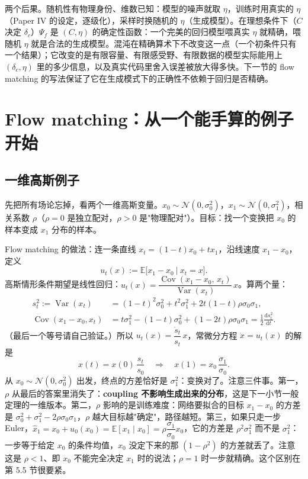 \documentclass[11pt,UTF8,fontset=none]{ctexart}
\newcommand{\E}{\mathbb{E}}
\newcommand{\dd}{\mathrm{d}}
\newcommand{\Var}{\operatorname{Var}}
\newcommand{\Cov}{\operatorname{Cov}}
\begin{document}
两个后果。随机性有物理身份、维数已知：模型的噪声就取 $\eta$，训练时用真实的 $\eta$（Paper IV 的设定，逐级化），采样时换随机的 $\eta$（生成模型）。在理想条件下（$C$ 决定 $\delta_c$）$\Psi_f$ 是 $(C,\eta)$ 的确定性函数：一个完美的回归模型喂真实 $\eta$ 就精确，喂随机 $\eta$ 就是合法的生成模型。混沌在精确算术下不改变这一点（一个初条件只有一个结果）；它改变的是有限容量、有限感受野、有限数据的模型实际能用上 $(\delta_c,\eta)$ 里的多少信息，以及真实代码里舍入误差被放大得多快。下一节的 flow matching 的写法保证了它在生成模式下的正确性不依赖于回归是否精确。

\section{Flow matching：从一个能手算的例子开始}

\subsection{一维高斯例子}

先把所有场论忘掉，看两个一维高斯变量。$x_0\sim\mathcal N(0,\sigma_0^2)$，$x_1\sim\mathcal N(0,\sigma_1^2)$，相关系数 $\rho$（$\rho=0$ 是独立配对，$\rho>0$ 是"物理配对"）。目标：找一个变换把 $x_0$ 的样本变成 $x_1$ 分布的样本。

Flow matching 的做法：连一条直线 $x_t=(1-t)x_0+tx_1$，沿线速度 $x_1-x_0$，定义
\begin{equation}
u_t(x):=\E\big[x_1-x_0\ \big|\ x_t=x\big].
\end{equation}
高斯情形条件期望是线性回归：$u_t(x)=\dfrac{\Cov(x_1-x_0,\,x_t)}{\Var(x_t)}\,x$。算两个量：
\begin{align}
s_t^2:=\Var(x_t)&=(1-t)^2\sigma_0^2+t^2\sigma_1^2+2t(1-t)\rho\sigma_0\sigma_1,\\
\Cov(x_1-x_0,x_t)&=t\sigma_1^2-(1-t)\sigma_0^2+(1-2t)\rho\sigma_0\sigma_1=\tfrac12\frac{\dd s_t^2}{\dd t}.
\end{align}
（最后一个等号请自己验证。）所以 $u_t(x)=\dfrac{\dot s_t}{s_t}\,x$，常微分方程 $\dot x=u_t(x)$ 的解是
\begin{equation}
x(t)=x(0)\,\frac{s_t}{s_0}\quad\Longrightarrow\quad x(1)=x_0\,\frac{\sigma_1}{\sigma_0}.
\end{equation}
从 $x_0\sim\mathcal N(0,\sigma_0^2)$ 出发，终点的方差恰好是 $\sigma_1^2$：变换对了。注意三件事。第一，$\rho$ 从最后的答案里消失了：\textbf{coupling 不影响生成出来的分布}，这是下一小节一般定理的一维版本。第二，$\rho$ 影响的是训练难度：网络要拟合的目标 $x_1-x_0$ 的方差是 $\sigma_0^2+\sigma_1^2-2\rho\sigma_0\sigma_1$，$\rho$ 越大目标越"确定"，路径越短。第三，如果只走一步 Euler，$\hat x_1=x_0+u_0(x_0)=\E[x_1\mid x_0]=\rho\dfrac{\sigma_1}{\sigma_0}x_0$，它的方差是 $\rho^2\sigma_1^2$ 而不是 $\sigma_1^2$：一步等于给定 $x_0$ 的条件均值，$x_0$ 没定下来的那 $(1-\rho^2)$ 的方差就丢了。注意这是 $\rho<1$、即 $x_0$ 不能完全决定 $x_1$ 时的说法；$\rho=1$ 时一步就精确。这个区别在第 5.5 节很要紧。
\end{document}
